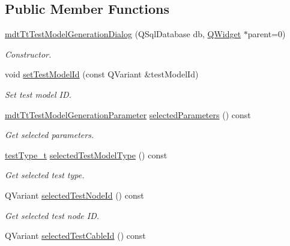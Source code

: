 \subsection*{Public Member Functions}
\begin{DoxyCompactItemize}
\item 
\hyperlink{classmdt_tt_test_model_generation_dialog_a41cf108d3dd4f65337b6ee821aa61f75}{mdt\-Tt\-Test\-Model\-Generation\-Dialog} (Q\-Sql\-Database db, \hyperlink{class_q_widget}{Q\-Widget} $\ast$parent=0)
\begin{DoxyCompactList}\small\item\em Constructor. \end{DoxyCompactList}\item 
void \hyperlink{classmdt_tt_test_model_generation_dialog_a8a96851eb1dbc343f8ca8b7fb7e2cd63}{set\-Test\-Model\-Id} (const Q\-Variant \&test\-Model\-Id)
\begin{DoxyCompactList}\small\item\em Set test model I\-D. \end{DoxyCompactList}\item 
\hyperlink{structmdt_tt_test_model_generation_parameter}{mdt\-Tt\-Test\-Model\-Generation\-Parameter} \hyperlink{classmdt_tt_test_model_generation_dialog_ae3a28f4788e45fc6877ccd3aabebf1f0}{selected\-Parameters} () const 
\begin{DoxyCompactList}\small\item\em Get selected parameters. \end{DoxyCompactList}\item 
\hyperlink{classmdt_tt_test_model_generation_dialog_a833486450bf0b6414015ab3b8e8432da}{test\-Type\-\_\-t} \hyperlink{classmdt_tt_test_model_generation_dialog_ad98f90e611b2ea423ddbd06fe8520ebd}{selected\-Test\-Model\-Type} () const 
\begin{DoxyCompactList}\small\item\em Get selected test type. \end{DoxyCompactList}\item 
Q\-Variant \hyperlink{classmdt_tt_test_model_generation_dialog_aaa97c8f06a9e983bb0b595df9f708855}{selected\-Test\-Node\-Id} () const 
\begin{DoxyCompactList}\small\item\em Get selected test node I\-D. \end{DoxyCompactList}\item 
Q\-Variant \hyperlink{classmdt_tt_test_model_generation_dialog_a96d923096ff088bb6c249e86d8ff1a6c}{selected\-Test\-Cable\-Id} () const 

\end{DoxyCompactItemize}
